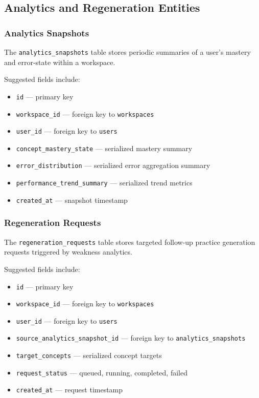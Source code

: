 \documentclass[11pt]{article}
\begin{document}
\subsection{Analytics and Regeneration Entities}

\subsubsection{Analytics Snapshots}
The \texttt{analytics\_snapshots} table stores periodic summaries of a user's mastery and error-state within a workspace.

Suggested fields include:
\begin{itemize}
\item \texttt{id} --- primary key
\item \texttt{workspace\_id} --- foreign key to \texttt{workspaces}
\item \texttt{user\_id} --- foreign key to \texttt{users}
\item \texttt{concept\_mastery\_state} --- serialized mastery summary
\item \texttt{error\_distribution} --- serialized error aggregation summary
\item \texttt{performance\_trend\_summary} --- serialized trend metrics
\item \texttt{created\_at} --- snapshot timestamp
\end{itemize}

\subsubsection{Regeneration Requests}
The \texttt{regeneration\_requests} table stores targeted follow-up practice generation requests triggered by weakness analytics.

Suggested fields include:
\begin{itemize}
\item \texttt{id} --- primary key
\item \texttt{workspace\_id} --- foreign key to \texttt{workspaces}
\item \texttt{user\_id} --- foreign key to \texttt{users}
\item \texttt{source\_analytics\_snapshot\_id} --- foreign key to \texttt{analytics\_snapshots}
\item \texttt{target\_concepts} --- serialized concept targets
\item \texttt{request\_status} --- queued, running, completed, failed
\item \texttt{created\_at} --- request timestamp
\end{itemize}
\end{document}
